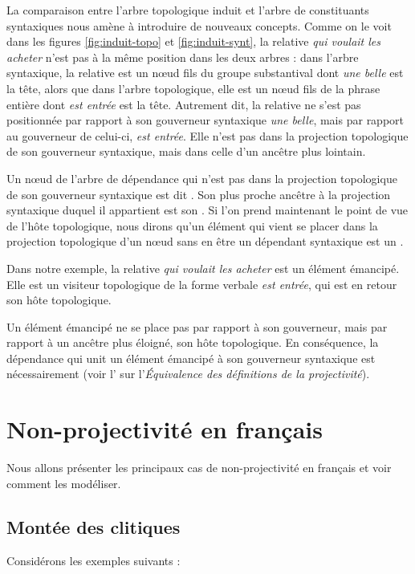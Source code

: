 La comparaison entre l’arbre topologique induit et l’arbre de constituants syntaxiques nous amène à introduire de nouveaux concepts. 
Comme on le voit dans les figures \ref{fig:induit-topo} et \ref{fig:induit-synt}, la relative \textit{qui voulait les acheter} n’est pas à la même position dans les deux arbres : dans l’arbre syntaxique, la relative est un nœud fils du groupe substantival dont \textit{une belle} est la tête, alors que dans l’arbre topologique, elle est un nœud fils de la phrase entière dont \textit{est entrée} est la tête. Autrement dit, la relative ne s’est pas positionnée par rapport à son gouverneur syntaxique \textit{une belle}, mais par rapport au gouverneur de celui-ci, \textit{est entrée}. Elle n'est pas dans la projection topologique de son gouverneur syntaxique, mais dans celle d'un ancêtre plus lointain.

{Un nœud de l'arbre de dépendance qui n'est pas dans la projection topologique de son gouverneur syntaxique est dit . Son plus proche ancêtre à la projection syntaxique duquel il appartient est son . Si l’on prend maintenant le point de vue de l’hôte topologique, nous dirons qu’un élément qui vient se placer dans la projection topologique d'un nœud sans en être un dépendant syntaxique est un .}

Dans notre exemple, la relative \textit{qui voulait les acheter} est un élément émancipé. Elle est un visiteur topologique de la forme verbale \textit{est entrée}, qui est en retour son hôte topologique.

Un élément émancipé ne se place pas par rapport à son gouverneur, mais par rapport à un ancêtre plus éloigné, son hôte topologique. 
En conséquence, la dépendance qui unit un élément émancipé à son gouverneur syntaxique est nécessairement  (voir l’ sur l’\textit{Équivalence des définitions de la projectivité}).


\section{Non-projectivité en français}\label{sec:3.5.32}

Nous allons présenter les principaux cas de non-projectivité en français et voir comment les modéliser.

\subsection{Montée des clitiques}
Considérons les exemples suivants :

